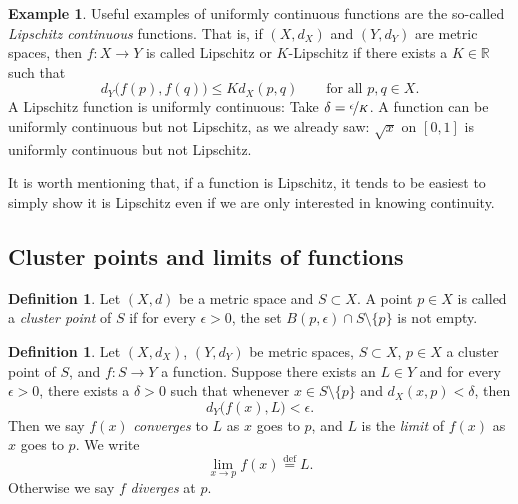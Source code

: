 \documentclass[12pt,openany]{book}
\newcommand{\R}{{\mathbb{R}}}
\theoremstyle{plain}
\theoremstyle{remark}
\theoremstyle{definition}
\newtheorem{defn}[thm]{Definition}
\theoremstyle{exercise}
\theoremstyle{example}
\newtheorem{example}[thm]{Example}
\begin{document}
\begin{example}
Useful examples of uniformly continuous functions are the so-called
\emph{Lipschitz continuous}%
%
functions.  That is, if
$(X,d_X)$ and $(Y,d_Y)$ are metric spaces, then $f \colon X \to Y$
is called Lipschitz or $K$-Lipschitz if there exists a $K \in \R$ such that
\begin{equation*}
d_Y\bigl(f(p),f(q)\bigr) \leq K d_X(p,q)
\qquad \text{for all } p,q \in X.
\end{equation*}
A Lipschitz function is uniformly continuous:
Take $\delta = \nicefrac{\epsilon}{K}$.
A function can be uniformly continuous
but not Lipschitz,
as we already saw: $\sqrt{x}$ on $[0,1]$
is uniformly continuous but not Lipschitz.

It is worth mentioning that,
if a function is Lipschitz, it tends to be
easiest to simply show it is Lipschitz even if we are only
interested in knowing continuity.
\end{example}

\subsection{Cluster points and limits of functions}

\begin{defn}
Let $(X,d)$ be a metric space and
$S \subset X$. A point $p \in X$ is called
a \emph{cluster point} of $S$
if for every $\epsilon > 0$, the set $B(p,\epsilon) \cap S
\setminus \{ p \}$ is not empty.
\end{defn}


\begin{defn}
%
Let $(X,d_X)$, $(Y,d_Y)$ be metric spaces, $S \subset X$, $p \in X$ a cluster point of $S$,
and $f \colon S \to Y$ a function.
Suppose there exists an $L \in Y$ and for every $\epsilon > 0$,
there exists a $\delta > 0$ such that whenever $x \in S \setminus \{ p \}$
and $d_X(x,p) < \delta$, then
\begin{equation*}
d_Y\bigl(f(x),L\bigr) < \epsilon .
\end{equation*}
Then we say $f(x)$
\emph{converges} to $L$ as $x$ goes
to $p$, and $L$ is the \emph{limit} of $f(x)$ as $x$
goes to $p$.  We write
\begin{equation*}
\lim_{x \to p} f(x) \overset{\text{def}}{=} L .
\end{equation*}
Otherwise we say $f$
\emph{diverges} at $p$.
\end{defn}
\end{document}
